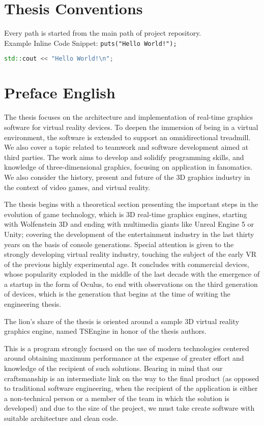 \newpage
\section{Thesis Conventions}
Every path is started from the main path of project repository.\\
Example Inline Code Snippet: \texttt{puts("Hello World!");}
\\
\begin{lstlisting}[language=c++, caption=Example Code Snippet(./example\_dir/example\_file.cpp)]
std::cout << "Hello World!\n";
\end{lstlisting}
\newpage
\section{Preface English} %
The thesis focuses on the architecture and implementation of real-time graphics software for virtual reality devices. To deepen the immersion of being in a virtual environment, the software is extended to support an omnidirectional treadmill. We also cover a topic related to teamwork and software development aimed at third parties. The work aims to develop and solidify programming skills, and knowledge of three-dimensional graphics, focusing on application in fanomatics. We also consider the history, present and future of the 3D graphics industry in the context of video games, and virtual reality.

The thesis begins with a theoretical section presenting the important steps in the evolution of game technology, which is 3D real-time graphics engines, starting with Wolfenstein 3D and ending with multimedia giants like Unreal Engine 5 or Unity; covering the development of the entertainment industry in the last thirty years on the basis of console generations. Special attention is given to the strongly developing virtual reality industry, touching the subject of the early VR of the previous highly experimental age. It concludes with commercial devices, whose popularity exploded in the middle of the last decade with the emergence of a startup in the form of Oculus, to end with observations on the third generation of devices, which is the generation that begins at the time of writing the engineering thesis.

The lion's share of the thesis is oriented around a sample 3D virtual reality graphics engine, named TSEngine in honor of the thesis authors.

This is a program strongly focused on the use of modern technologies centered around obtaining maximum performance at the expense of greater effort and knowledge of the recipient of such solutions. Bearing in mind that our craftsmanship is an intermediate link on the way to the final product (as opposed to traditional software engineering, when the recipient of the application is either a non-technical person or a member of the team in which the solution is developed) and due to the size of the project, we must take create software with suitable architecture and clean code.

